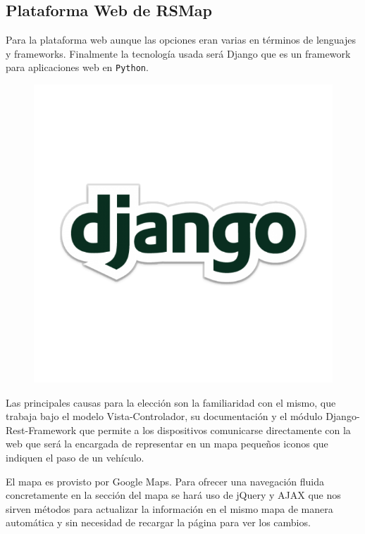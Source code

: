 \subsection{Plataforma Web de RSMap}

Para la plataforma web aunque las opciones eran varias en términos de lenguajes y frameworks. Finalmente la tecnología usada será Django que es un framework para aplicaciones web en {\tt Python}.

\begin{figure}[!ht]
  \begin{center}
    \includegraphics[scale=0.1]{../images/web/django-logo.png}
    \label{fig:drflog}
	\end{center}
\end{figure}

Las principales causas para la elección son la familiaridad con el mismo, que trabaja bajo el modelo Vista-Controlador, su documentación y el módulo Django-Rest-Framework que permite a los dispositivos comunicarse directamente con la web que será la encargada de representar en un mapa pequeños iconos que indiquen el paso de un vehículo.

El mapa es provisto por Google Maps.  Para ofrecer una navegación fluida concretamente en la sección del mapa se hará uso de jQuery y AJAX que nos sirven métodos para actualizar la información en el mismo mapa de manera automática y sin necesidad de recargar la página para ver los cambios.

